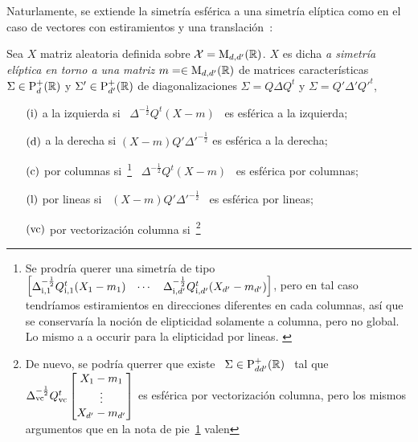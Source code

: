 Naturlamente, se  extiende la simetr\'ia esf\'erica a  una simetr\'ia el\'iptica
como en el  caso de vectores con estiramientos  y una translaci\'on~\cite{Mal61,
  Tyl82, Chm80, FraNg80, Kar81:1, Kar81, Kar89, JenGoo81, GupNag99, GupVar13}:
%
\begin{definicion}
%
  Sea $X$  matriz aleatoria  definida sobre $\mathcal{X}  = \mathrm{M}_{d,d'}(\mathbb{R})$.   $X$ es
  dicha  {\em  a  simetr\'ia  el\'iptica  en   torno  a  una  matriz  $m  =  \in
    \mathrm{M}_{d,d'}(\mathbb{R})$}    de    matrices    caracter\'isticas   $\Sigma    \in
  \mathrm{P}_d^+(\mathbb{R})$  y  $\Sigma'  \in  \mathrm{P}_{d'}^+(\mathbb{R})$  de  diagonalizaciones
  $\Sigma = Q \Delta Q^t$ y $\Sigma = Q' \Delta' Q'^t$,
  \begin{itemize}
  \item[$(\mathrm{i})$]  a  la izquierda  si  \  $\Delta^{-\frac12}  Q^t (X-m)$  \  es
    esf\'erica a la izquierda;
  \item[$(\mathrm{d})$] a la derecha si $(X-m) Q' \Delta'^{-\frac12} $ es esf\'erica a
    la derecha;
  \item[$(\mathrm{c})$] por  columnas si~\footnote{Se prodr\'ia  querer una simetr\'ia
      de tipo $\begin{bmatrix} \Delta_{\mathrm{i},1}^{-\frac12} Q_{\mathrm{i},1}^t (X_1-m_1)
        &      \cdots      &      \Delta_{\mathrm{i},d'}^{-\frac12}      Q_{\mathrm{i},d'}^t
        (X_{d'}-m_{d'})   \end{bmatrix}$,   pero   en  tal   caso   tendr\'iamos
      estiramientos  en direcciones diferentes  en cada  columnas, as\'i  que se
      conservar\'ia  la noci\'on  de elipticidad  solamente a  columna,  pero no
      global.    Lo    mismo   a   a    occurir   para   la    elipticidad   por
      lineas.   \label{Foot:MP:EDc}}  \   $\Delta^{-\frac12}  Q^t  (X-m)$  \  es
    esf\'erica por columnas;
  \item[$(\mathrm{l})$] por lineas si \  $(X-m) Q' \Delta'^{-\frac12}$ \ es esf\'erica
    por lineas;
  \item[$(\mathrm{vc})$]  por   vectorizaci\'on  columna  si~\footnote{De   nuevo,  se
      podr\'ia querrer que existe \ $\Sigma \in \mathrm{P}_{dd'}^+(\mathbb{R})$ \ tal que \
      $\Delta_{\mathrm{vc}}^{-\frac12}  Q_{\mathrm{vc}}^t \begin{bmatrix}  X_1-m_1 \\  \vdots \\
        X_{d'}-m_{d'} \end{bmatrix}$ es  esf\'erica por vectorizaci\'on columna,
      pero los mismos  argumentos que en la nota  de pie~\ref{Foot:MP:EDc} valen
}
\end{itemize}
\end{definicion}
